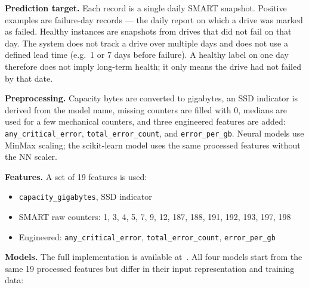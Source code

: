 \documentclass[sigconf,natbib=false]{acmart}
\begin{document}
\textbf{Prediction target.} Each record is a single daily SMART snapshot. Positive examples are failure-day records — the daily report on which a drive was marked as failed. Healthy instances are snapshots from drives that did not fail on that day. The system does not track a drive over multiple days and does not use a defined lead time (e.g.\ 1 or 7 days before failure). A healthy label on one day therefore does not imply long-term health; it only means the drive had not failed by that date.

\textbf{Preprocessing.} Capacity bytes are converted to gigabytes, an SSD indicator is derived from the model name, missing counters are filled with 0, medians are used for a few mechanical counters, and three engineered features are added: \texttt{any\_critical\_error}, \texttt{total\_error\_count}, and \texttt{error\_per\_gb}. Neural models use MinMax scaling; the scikit-learn model uses the same processed features without the NN scaler.

\textbf{Features.} A set of 19 features is used:
\begin{itemize}
  \item \texttt{capacity\_gigabytes}, SSD indicator
  \item SMART raw counters: 1, 3, 4, 5, 7, 9, 12, 187, 188, 191, 192, 193, 197, 198
  \item Engineered: \texttt{any\_critical\_error}, \texttt{total\_error\_count}, \texttt{error\_per\_gb}
\end{itemize}

\textbf{Models.} The full implementation is available at~\cite{petek2026github}. All four models start from the same 19 processed features but differ in their input representation and training data:
\end{document}
